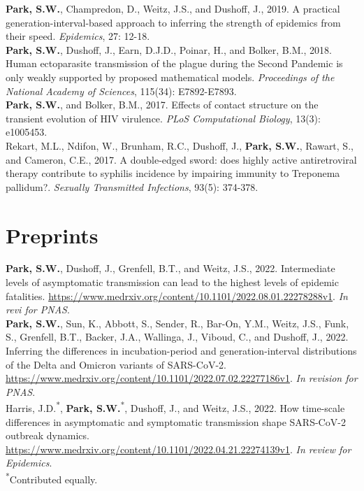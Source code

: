 \documentclass[11pt]{article} %
\begin{document}
 \textbf{Park, S.W.}, Champredon, D., Weitz, J.S., and Dushoff, J., 2019. A practical generation-interval-based approach to inferring the strength of epidemics from their speed. \textit{Epidemics}, 27: 12-18.\\

 \textbf{Park, S.W.}, Dushoff, J., Earn, D.J.D., Poinar, H., and Bolker, B.M., 2018. Human
ectoparasite transmission of the plague during the Second Pandemic is only weakly
supported by proposed mathematical models. \textit{Proceedings of the National Academy of Sciences}, 115(34): E7892-E7893.\\

 \textbf{Park, S.W.}, and Bolker, B.M., 2017. Effects of contact structure on the transient
evolution of HIV virulence. \textit{PLoS Computational Biology}, 13(3): e1005453.\\

 Rekart, M.L., Ndifon, W., Brunham, R.C., Dushoff, J., \textbf{Park, S.W.}, Rawart, S., and
Cameron, C.E., 2017. A double-edged sword: does highly active antiretroviral therapy contribute to syphilis incidence by impairing immunity to Treponema pallidum?.
\textit{Sexually Transmitted Infections}, 93(5): 374-378.\\

\section*{Preprints}

 \textbf{Park, S.W.}, Dushoff, J., Grenfell, B.T., and Weitz, J.S., 2022. Intermediate levels of asymptomatic transmission can lead to the highest levels of epidemic fatalities. \url{https://www.medrxiv.org/content/10.1101/2022.08.01.22278288v1}. \textit{In revi for PNAS}.\\

 \textbf{Park, S.W.}, Sun, K., Abbott, S., Sender, R., Bar-On, Y.M., Weitz, J.S., Funk, S., Grenfell, B.T., Backer, J.A., Wallinga, J., Viboud, C., and Dushoff, J., 2022. Inferring the differences in incubation-period and generation-interval distributions of the Delta and Omicron variants of SARS-CoV-2. \url{https://www.medrxiv.org/content/10.1101/2022.07.02.22277186v1}. \textit{In revision for PNAS}.\\

 Harris, J.D.\textsuperscript{*}, \textbf{Park, S.W.}\textsuperscript{*}, Dushoff, J., and Weitz, J.S., 2022. How time-scale differences in asymptomatic and symptomatic transmission shape SARS-CoV-2 outbreak dynamics. \url{https://www.medrxiv.org/content/10.1101/2022.04.21.22274139v1}. \textit{In review for Epidemics}.\\
\textsuperscript{*}Contributed equally.\\
\end{document}
